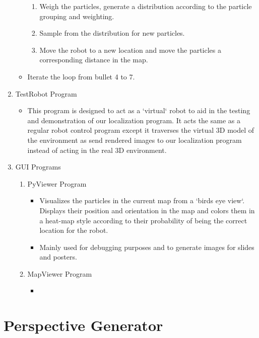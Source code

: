 \documentclass[a4paper,11pt]{article}
\begin{document}
\begin{enumerate}
\begin{itemize}
\begin{enumerate}
                \item Weigh the particles, generate a distribution according to the particle grouping and weighting.
                \item Sample from the distribution for new particles.
                \item Move the robot to a new location and move the particles a corresponding distance in the map.
              \end{enumerate}
            \item Iterate the loop from bullet 4 to 7.
            \end{itemize}
         \item TestRobot Program
	    \begin{itemize}
	     \item This program is designed to act as a `virtual` robot to aid in the testing and demonstration of our localization program. It acts the same as a regular robot control program except it traverses the virtual 3D model of the environment as send rendered images to our localization program instead of acting in the real 3D environment.
	    \end{itemize}
	 \item GUI Programs
	   \begin{enumerate}
	   \item PyViewer Program
	      \begin{itemize}
	      \item Visualizes the particles in the current map from a `birds eye view`. Displays their position and orientation in the map and colors them in a heat-map style according to their probability of being the correct location for the robot.
	      \item Mainly used for debugging purposes and to generate images for slides and posters.
	      \end{itemize}
	   \item MapViewer Program
	      \begin{itemize}
	      \item 
	      \end{itemize}
	    \end{enumerate} %
	    
	  \end{enumerate} %
        \newpage

        
        
        
    \section{Perspective Generator}
\end{document}
